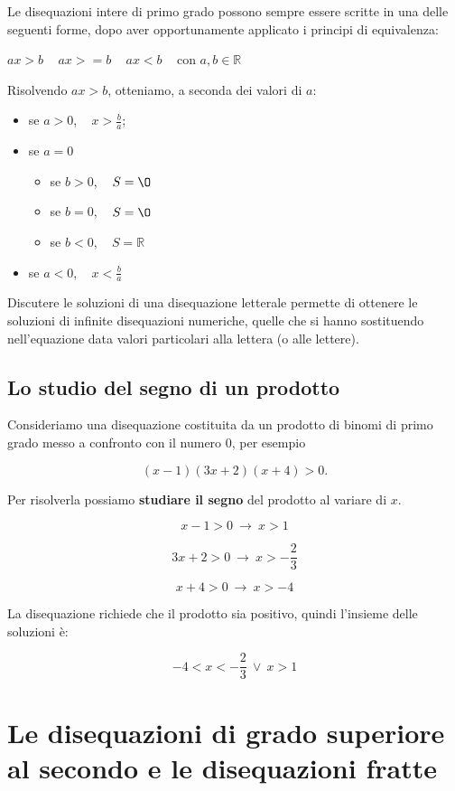 \documentclass[12pt, letterpaper]{article}
\begin{document}
	Le disequazioni intere di primo grado possono sempre essere scritte in una delle seguenti forme, dopo aver opportunamente applicato i principi di equivalenza:
	
	\begin{center}
		$ax > b$ ~ $ax >= b$ ~ $ax < b$ ~ con $a, b \in \mathbb{R}$
	\end{center}

	Risolvendo $ax > b$, otteniamo, a seconda dei valori di $a$:
	
	\begin{itemize}
		\item se $a > 0$, ~ $x > \tfrac{b}{a}$;
		\item se $a = 0$
		\begin{itemize}
			\item se $b > 0$, ~ $S = \O$
			\item se $b = 0$, ~ $S = \O$
			\item se $b < 0$, ~ $S = \mathbb{R}$
		\end{itemize}
		\item se $a < 0$, ~ $x < \tfrac{b}{a}$
	\end{itemize}

	Discutere le soluzioni di una disequazione letterale permette di ottenere le soluzioni di infinite disequazioni numeriche, quelle che si hanno sostituendo nell'equazione data valori particolari alla lettera (o alle lettere).
	
	\subsection{Lo studio del segno di un prodotto}
	
	Consideriamo una disequazione costituita da un prodotto di binomi di primo grado messo a confronto con il numero 0, per esempio
	
	\[
		(x - 1)(3x + 2)(x + 4) > 0.
	\]
	
	Per risolverla possiamo \textbf{studiare il segno} del prodotto al variare di $x$.
	
	\[x - 1 > 0 ~ \rightarrow ~ x > 1\]
	
	\[3x + 2 > 0 ~ \rightarrow ~ x > -\frac{2}{3}\]
	
	\[x + 4 > 0 ~ \rightarrow ~ x > -4\]
	
	La disequazione richiede che il prodotto sia positivo, quindi l'insieme delle soluzioni è:
	
	\[-4 < x < -\frac{2}{3} ~ \lor ~ x > 1\]
	
	\section{Le disequazioni di grado superiore al secondo e le disequazioni fratte}
	
\end{document}
